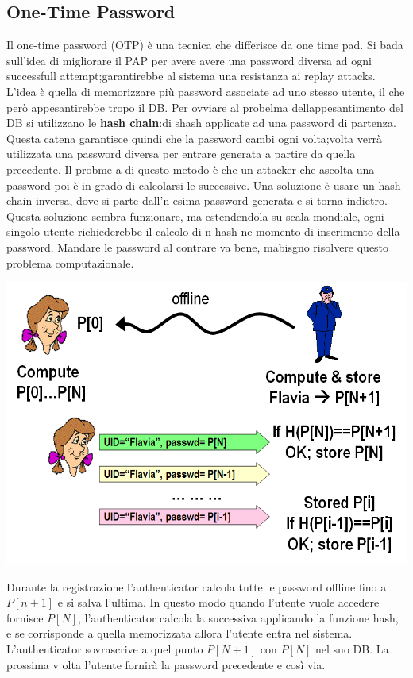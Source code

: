 \documentclass{book}
\theoremstyle{remark}
\begin{document}
\subsection{One-Time Password}
Il one-time password (OTP) è una tecnica che differisce da one time pad\@.
Si bada sull'idea di migliorare il PAP per avere avere una password diversa ad ogni successfull attempt;\@questo garantirebbe al sistema una resistanza ai replay attacks\@.\newline
L'idea è quella di memorizzare più password associate ad uno stesso utente, il che però appesantirebbe tropo il DB\@.
Per ovviare al probelma dellappesantimento del DB si utilizzano le \textbf{hash chain}:\@catene di shash applicate ad una password di partenza\@. Questa catena garantisce quindi che la password cambi ogni volta;\@ogni volta verrà utilizzata una password diversa per entrare generata a partire da quella precedente\@. Il probme a di questo metodo è che un attacker che ascolta una password poi è in grado di calcolarsi le successive\@. Una soluzione è usare un hash chain inversa, dove si parte dall'n-esima password generata e si torna indietro\@. Questa soluzione sembra funzionare, ma estendendola su scala mondiale, ogni singolo utente richiederebbe il calcolo di n hash ne momento di inserimento della password\@.\newline
Mandare le password al contrare va bene, mabisgno risolvere questo problema computazionale\@.\newline
\begin{center}
	\includegraphics[scale=0.5]{OTP}
\end{center}
Durante la registrazione l'authenticator calcola tutte le password offline fino a \(P[n+1]\) e si salva l'ultima\@. In questo modo quando l'utente vuole accedere fornisce \(P[N]\), l'authenticator calcola la successiva applicando la funzione hash, e se corrisponde a quella memorizzata allora l'utente entra nel sistema\@. L'authenticator sovrascrive a quel punto \(P[N+1]\) con \(P[N]\) nel suo DB\@. La prossima v olta l'utente fornirà la password precedente e così via\@.\newline
\end{document}
